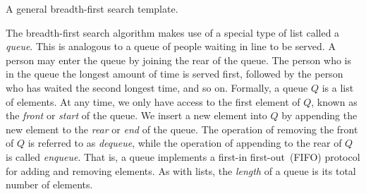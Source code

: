 \begin{algorithm}[!htbp]

\caption{A general breadth-first search template.}
\label{alg:graph_algorithms:breadth_first_search_template}
\end{algorithm}

The breadth-first search algorithm makes
use of a special type of list called a \emph{queue}. This
is analogous to a queue of people waiting in line to be served. A
person may enter the queue by joining the rear of the queue. The
person who is in the queue the longest amount of time is served first,
followed by the person who has waited the second longest time, and so
on. Formally, a queue $Q$ is a list of elements. At any
time, we only have access to the first element of $Q$, known as the
\emph{front} or \emph{start} of
the queue. We insert a new element into $Q$ by appending the new
element to the \emph{rear} or
\emph{end} of the queue. The operation of removing
the front of $Q$ is referred to as \emph{dequeue},
while the operation of appending to the rear of $Q$ is called
\emph{enqueue}. That is, a queue implements a first-in
first-out~(FIFO) protocol for
adding and removing elements. As with lists, the
\emph{length} of a queue is its total number of
elements.

